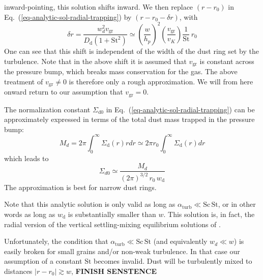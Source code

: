 \documentclass{aa}
\begin{document}
inward-pointing, this solution shifts inward. We then replace $(r-r_0)$
in Eq.~(\ref{eq-analytic-sol-radial-trapping}) by $(r-r_0-\delta r)$, with
\begin{equation}
  \delta r=\frac{w_d^2v_{\mathrm{gr}}}{D_{\mathrm{d}}(1+\mathrm{St}^2)}
  \simeq \left(\frac{w}{h_p}\right)^2\left(\frac{v_{\mathrm{gr}}}{v_K}\right)
  \frac{1}{\mathrm{St}}\,r_0
\end{equation}
One can see that this shift is independent of the width of the dust ring set by
the turbulence. Note that in the above shift it is assumed that
$v_{\mathrm{gr}}$ is constant across the pressure bump, which breaks mass
conservation for the gas. The above treatment of $v_{\mathrm{gr}}\neq 0$ is
therefore only a rough approximation. We will from here onward return to our
assumption that $v_{\mathrm{gr}}=0$.
  
The normalization constant $\Sigma_{\mathrm{d0}}$ in
Eq.~(\ref{eq-analytic-sol-radial-trapping}) can be approximately expressed in
terms of the total dust mass trapped in the pressure bump:
\begin{equation}
  M_d = 2\pi \int_0^\infty \Sigma_{\mathrm{d}}(r) rdr \simeq
  2\pi r_0 \int_0^\infty \Sigma_{\mathrm{d}}(r)dr
\end{equation}
which leads to
\begin{equation}
\Sigma_{d0}\simeq \frac{M_d}{(2\pi)^{3/2}\, r_0\,w_{\mathrm{d}}}
\end{equation}
The approximation is best for narrow dust rings.

Note that this analytic solution is only valid as long as
$\alpha_{\mathrm{turb}}\ll \mathrm{Sc}\,\mathrm{St}$, or in other words as long
as $w_{\mathrm{d}}$ is substantially smaller than $w$.  This solution is, in
fact, the radial version of the vertical settling-mixing equilibrium solutions
of \citet{1995Icar..114..237D}.

Unfortunately, the condition that $\alpha_{\mathrm{turb}}\ll
\mathrm{Sc}\,\mathrm{St}$ (and equivalently $w_d\ll w$) is easily broken for
small grains and/or non-weak turbulence. In that case our assumption of
a constant $\mathrm{St}$ becomes invalid. Dust will be turbulently mixed
to distances $|r-r_0|\gtrsim w$, {\bf FINISH SENSTENCE}
\end{document}
